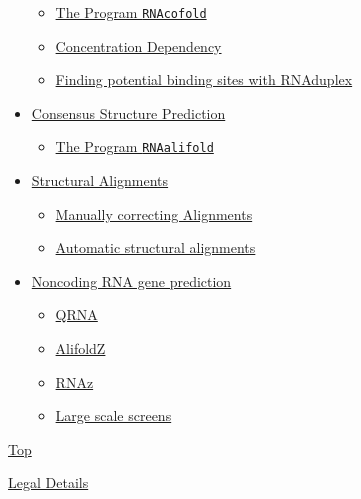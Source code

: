 \documentclass[]{article}
\providecommand{\tightlist}{%
  \setlength{\itemsep}{0pt}\setlength{\parskip}{0pt}}
\begin{document}
\begin{itemize}
  \begin{itemize}
  \tightlist
  \item
    \hyperref[sec6ux5f1]{The Program \texttt{RNAcofold}}
  \item
    \hyperref[sec6ux5f2]{Concentration Dependency}
  \item
    \hyperref[sec6ux5f3]{Finding potential binding sites with RNAduplex}
  \end{itemize}
\item
  \hyperref[sec7]{Consensus Structure Prediction{}}

  \begin{itemize}
  \tightlist
  \item
    \hyperref[sec7ux5f1]{The Program \texttt{RNAalifold}}
  \end{itemize}
\item
  \hyperref[sec8]{Structural Alignments{}}

  \begin{itemize}
  \tightlist
  \item
    \hyperref[sec8ux5f1]{Manually correcting Alignments}
  \item
    \hyperref[sec8ux5f2]{Automatic structural alignments}
  \end{itemize}
\item
  \hyperref[sec9]{Noncoding RNA gene prediction{}}

  \begin{itemize}
  \tightlist
  \item
    \hyperref[sec9ux5f1]{QRNA}
  \item
    \hyperref[sec9ux5f2]{AlifoldZ}
  \item
    \hyperref[sec9ux5f3]{RNAz}
  \item
    \hyperref[sec9ux5f4]{Large scale screens}
  \end{itemize}
\end{itemize}

\hyperref[]{Top}

\href{https://www.tbi.univie.ac.at/legal.html}{Legal Details}
\end{document}
